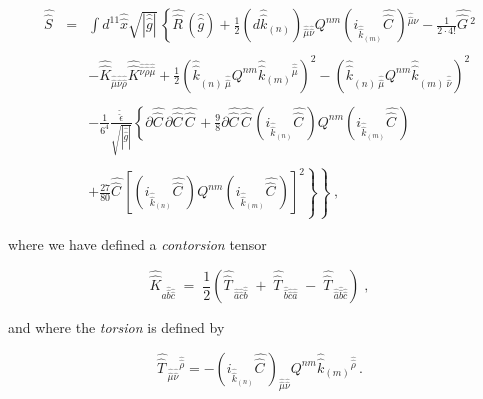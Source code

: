 \documentclass[12pt,a4paper]{article}
\begin{document}
\begin{equation}
\begin{array}{rcl}
\hat{\hat{S}\,}
& = &
{\displaystyle\int} d^{11}\hat{\hat{x}}\sqrt{|\hat{\hat{g}}|}\,
\left\{
\hat{\hat{R}\,}\left(\hat{\hat{g}}\right)
+\textstyle{\frac{1}{2}}\left(d\hat{\hat{k}}_{(n)}\right)
   {}_{\hat{\hat{\mu}}\hat{\hat{\nu}}}Q^{nm}
   \left( i_{\hat{\hat{k}}_{(m)}}\hat{\hat{C}\,}\right)
   {}^{\hat{\hat{\mu}}\hat{\hat{\nu}}}
-\textstyle{\frac{1}{2\cdot 4!}} \hat{\hat{G}\,}{}^{2}
\right.\\
& & \\
& &
-\hat{\hat{K}}_{\hat{\hat{\mu}}\hat{\hat{\nu}}\hat{\hat{\rho}}}
\hat{\hat{K}}{}^{\hat{\hat{\nu}}\hat{\hat{\rho}}\hat{\hat{\mu}}}
+\textstyle{\frac{1}{2}}
\left( \hat{\hat{k}}_{(n)\ \hat{\hat{\mu}}}Q^{nm}
\hat{\hat{k}}_{(m)}{}^{\hat{\hat{\mu}}}\right)^{2}
-\left(  \hat{\hat{k}}_{(n)\ \hat{\hat{\mu}}}Q^{nm}
\hat{\hat{k}}_{(m)\ \hat{\hat{\nu}}}\right)^{2}
\\
& & \\
& &
-\frac{1}{6^{4}}
\frac{\hat{\hat{\epsilon}}}{\sqrt{|\hat{\hat{g}}|}}
\left\{
\partial\hat{\hat{C}\,}\partial\hat{\hat{C}\,}\hat{\hat{C}\,}
+ \frac{9}{8}\partial\hat{\hat{C}\,}\hat{\hat{C}\,}
\left(i_{\hat{\hat{k}}_{(n)}}\hat{\hat{C}\,}\right)
Q^{nm}
\left(i_{\hat{\hat{k}}_{(m)}}\hat{\hat{C}\,}\right)
\right. \\
& & \\
& &
\left.
\left.
+ \frac{27}{80}
\hat{\hat{C}\,}
\left[
\left(i_{\hat{\hat{k}}_{(n)}}\hat{\hat{C}\,}\right)
 Q^{nm}
\left(i_{\hat{\hat{k}}_{(m)}}\hat{\hat{C}\,}\right)
\right]^{2}
\right\}
\right\}\; ,
\end{array}
\label{eq:masact.11}
\end{equation}

\noindent where we have defined a {\em contorsion} tensor

\begin{equation}
\hat{\hat{K}}_{\hat{\hat{a}}\hat{\hat{b}}\hat{\hat{c}}}
\;=\; {\textstyle\frac{1}{2}}
\left(
\hat{\hat{T}\,}_{\hat{\hat{a}}\hat{\hat{c}}\hat{\hat{b}}}
\; +\; \hat{\hat{T}\,}_{\hat{\hat{b}}\hat{\hat{c}}\hat{\hat{a}}}
\; -\; \hat{\hat{T}\,}_{\hat{\hat{a}}\hat{\hat{b}}\hat{\hat{c}}}
\right) \; ,
\label{eq:torsion.2}
\end{equation}

\noindent and where the {\em torsion} is defined by

\begin{equation}
\hat{\hat{T}\,}_{\hat{\hat{\mu}}\hat{\hat{\nu}}}{}^{\hat{\hat{\rho}}}
= -\left(i_{\hat{\hat{k}}_{(n)}}\hat{\hat{C}\,}
\right)_{\hat{\hat{\mu}}\hat{\hat{\nu}}} Q^{nm}
\hat{\hat{k}}_{(m)}{}^{\hat{\hat{\rho}}}\, .
\end{equation}
\end{document}
